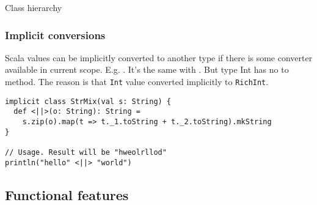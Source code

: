 \documentclass{beamer}
\begin{document}
\begin{frame}{Class hierarchy}


\end{frame}


\begin{frame}[fragile]
\frametitle{Implicit conversions}

Scala values can be implicitly converted to another type if there is some converter available in current scope. E.g.
. It's the same with . But type Int has no to method.
The reason is that \texttt{Int} value converted implicitly to \texttt{RichInt}.

\begin{example}
\begin{lstlisting}
implicit class StrMix(val s: String) {
  def <||>(o: String): String =
    s.zip(o).map(t => t._1.toString + t._2.toString).mkString
}

// Usage. Result will be "hweolrllod"
println("hello" <||> "world")
\end{lstlisting}
\end{example}

\end{frame}

\subsection{Functional features}
\end{document}
